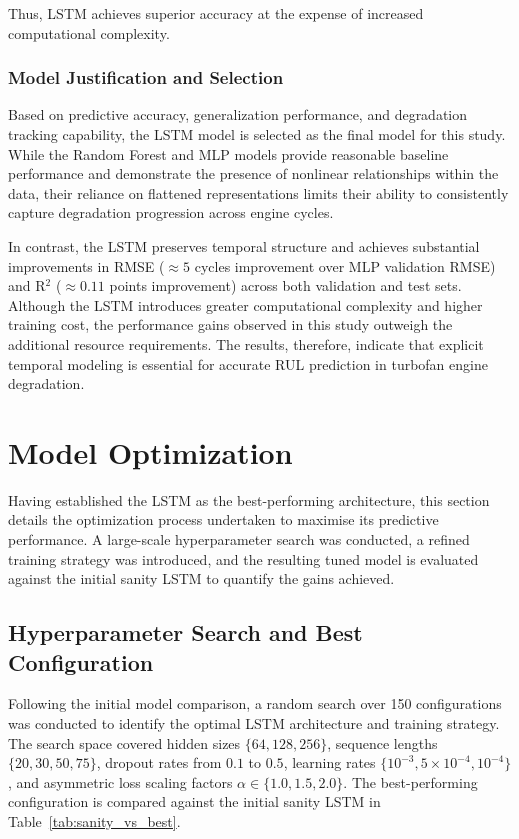 \documentclass[conference]{IEEEtran}
\begin{document}
Thus, LSTM achieves superior accuracy at the expense of increased computational complexity.

\subsubsection{Model Justification and Selection}
Based on predictive accuracy, generalization performance, and degradation tracking capability, the LSTM model is selected as the final model for this study. While the Random Forest and MLP models provide reasonable baseline performance and demonstrate the presence of nonlinear relationships within the data, their reliance on flattened representations limits their ability to consistently capture degradation progression across engine cycles.

In contrast, the LSTM preserves temporal structure and achieves substantial improvements in RMSE ($\approx 5$ cycles improvement over MLP validation RMSE) and R$^2$ ($\approx 0.11$ points improvement) across both validation and test sets. Although the LSTM introduces greater computational complexity and higher training cost, the performance gains observed in this study outweigh the additional resource requirements. The results, therefore, indicate that explicit temporal modeling is essential for accurate RUL prediction in turbofan engine degradation.

\section{Model Optimization}

Having established the LSTM as the best-performing architecture, this section details the optimization process undertaken to maximise its predictive performance. A large-scale hyperparameter search was conducted, a refined training strategy was introduced, and the resulting tuned model is evaluated against the initial sanity LSTM to quantify the gains achieved.

\subsection{Hyperparameter Search and Best Configuration}

Following the initial model comparison, a random search over 150 configurations was conducted to identify the optimal LSTM architecture and training strategy. The search space covered hidden sizes $\{64, 128, 256\}$, sequence lengths $\{20, 30, 50, 75\}$, dropout rates from $0.1$ to $0.5$, learning rates $\{10^{-3}, 5\times10^{-4}, 10^{-4}\}$, and asymmetric loss scaling factors $\alpha \in \{1.0, 1.5, 2.0\}$. The best-performing configuration is compared against the initial sanity LSTM in Table~\ref{tab:sanity_vs_best}.
\end{document}
